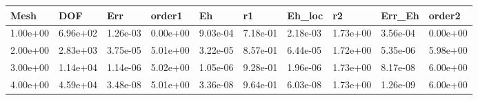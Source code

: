 \begin{tabular}{llllllllll}
Mesh & DOF & Err & order1 & Eh & r1 & Eh_loc & r2 & Err_Eh & order2 \\ 
\hline 
1.00e+00 & 6.96e+02 & 1.26e-03 & 0.00e+00 & 9.03e-04 & 7.18e-01 & 2.18e-03 & 1.73e+00 & 3.56e-04 & 0.00e+00 \\ 
2.00e+00 & 2.83e+03 & 3.75e-05 & 5.01e+00 & 3.22e-05 & 8.57e-01 & 6.44e-05 & 1.72e+00 & 5.35e-06 & 5.98e+00 \\ 
3.00e+00 & 1.14e+04 & 1.14e-06 & 5.02e+00 & 1.05e-06 & 9.28e-01 & 1.96e-06 & 1.73e+00 & 8.17e-08 & 6.00e+00 \\ 
4.00e+00 & 4.59e+04 & 3.48e-08 & 5.01e+00 & 3.36e-08 & 9.64e-01 & 6.03e-08 & 1.73e+00 & 1.26e-09 & 6.00e+00 \\ 
\hline 
\end{tabular}